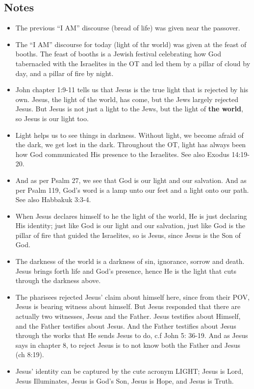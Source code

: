 \subsection*{Notes}
\begin{itemize}
  \item{The previous “I AM” discourse (bread of life) was given near the passover.}
  \item{The “I AM” discourse for today (light of thr world) was given at the feast of booths. The feast of booths is a Jewish festival celebrating how God tabernacled with the Israelites in the OT and led them by a pillar of cloud by day, and a pillar of fire by night. }
  \item{John chapter 1:9-11 tells us that Jesus is the true light that is rejected by his own. Jesus, the light of the world, has come, but the Jews largely rejected Jesus. But Jesus is not just a light to the Jews, but the light of \textbf{the world}, so Jesus is our light too. }
  \item{Light helps us to see things in darkness. Without light, we become afraid of the dark, we get lost in the dark. Throughout the OT, light has always been how God communicated His presence to the Israelites. See also Exodus 14:19-20.}
  \item{And as per Psalm 27, we see that God is our light and our salvation. And as per Psalm 119, God’s word is a lamp unto our feet and a light onto our path. See also Habbakuk 3:3-4.}
  \item{When Jesus declares himself to he the light of the world, He is just declaring His identity; just like God is our light and our salvation, just like God is the pillar of fire that guided the Israelites, so is Jesus, since Jesus is the Son of God. }
  \item{The darkness of the world is a darkness of sin, ignorance, sorrow and death. Jesus brings forth life and God’s presence, hence He is the light that cuts through the darkness above.}
  \item{The pharisees rejected Jesus’ claim about himself here, since from their POV, Jesus is bearing witness about himself. But Jesus responded that there are actually two witnesses, Jesus and the Father. Jesus testifies about Himself, and the Father testifies about Jesus. And the Father testifies about Jesus through the works that He sends Jesus to do, c.f John 5: 36-19. And as Jesus says in chapter 8, to reject Jesus is to not know both the Father and Jesus (ch 8:19).}
  \item{Jesus’ identity can be captured by the cute acronym LIGHT; Jesus is Lord, Jesus Illuminates, Jesus is God’s Son, Jesus is Hope, and Jesus is Truth.}

\end{itemize}
